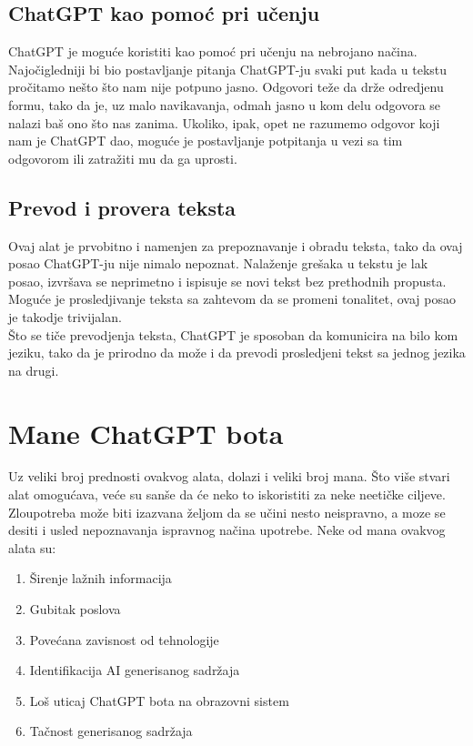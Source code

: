 \documentclass[fleqn, 12pt]{article}
\begin{document}
    \subsection{ChatGPT kao pomoć pri učenju}
        \begin{text}
            ChatGPT je moguće koristiti kao pomoć pri učenju na nebrojano načina. Najočigledniji bi bio postavljanje pitanja ChatGPT-ju svaki put kada u tekstu pročitamo nešto što nam nije potpuno jasno. Odgovori teže da drže odredjenu formu, tako da je, uz malo navikavanja, odmah jasno u kom delu odgovora se nalazi baš ono što nas zanima. Ukoliko, ipak, opet ne razumemo odgovor koji nam je ChatGPT dao, moguće je postavljanje potpitanja u vezi sa tim odgovorom ili zatražiti mu da ga uprosti. \cite{G7}
        \end{text}
    \subsection{Prevod i provera teksta}
        \begin{text}
            Ovaj alat je prvobitno i namenjen za prepoznavanje i obradu teksta,  tako da ovaj posao ChatGPT-ju nije nimalo nepoznat. Nalaženje grešaka u tekstu je lak posao, izvršava se neprimetno i ispisuje se novi tekst bez prethodnih propusta. Moguće je prosledjivanje teksta sa zahtevom da se promeni tonalitet, ovaj posao je takodje trivijalan.
            \\
            Što se tiče prevodjenja teksta, ChatGPT je sposoban da komunicira na bilo kom jeziku, tako da je prirodno da može i da prevodi prosledjeni tekst sa jednog jezika na drugi.
        \end{text}
\newpage
\section{Mane ChatGPT bota}
Uz veliki broj prednosti ovakvog alata, dolazi i veliki broj mana. Što više stvari alat omogućava, veće su sanše da će neko to iskoristiti za neke neetičke ciljeve. Zloupotreba može biti izazvana željom da se učini nesto neispravno, a moze se desiti i usled nepoznavanja ispravnog načina upotrebe. Neke od mana ovakvog alata su:
\begin{enumerate}
  \item Širenje lažnih informacija
  \item Gubitak poslova
  \item Povećana zavisnost od tehnologije
  \item Identifikacija AI generisanog sadržaja
  \item Loš uticaj ChatGPT bota na obrazovni sistem
  \item Tačnost generisanog sadržaja
\end{enumerate}
\end{document}
